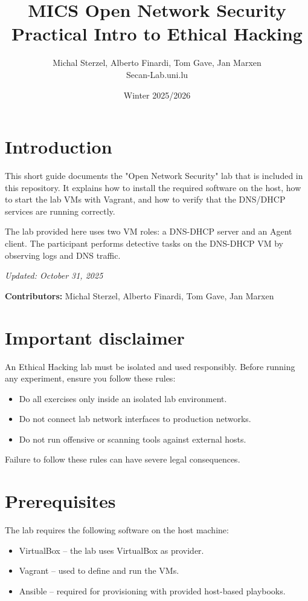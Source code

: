 \documentclass[11pt,a4paper]{article}
\title{\textbf{MICS Open Network Security}\\[0.5em]
Practical Intro to Ethical Hacking}
\author{Michal Sterzel, Alberto Finardi, Tom Gave, Jan Marxen \\ \small Secan-Lab.uni.lu}
\date{Winter 2025/2026}
\begin{document}
\maketitle
\tableofcontents
\newpage

\section{Introduction}
This short guide documents the "Open Network Security" lab that is
included in this repository. It explains how to install the required
software on the host, how to start the lab VMs with Vagrant, 
and how to verify that the DNS/DHCP services are running correctly.

The lab provided here uses two VM roles: a DNS-DHCP server and an Agent
client. The participant performs detective tasks on the DNS-DHCP VM by
observing logs and DNS traffic.

\textit{Updated: October 31, 2025}

\textbf{Contributors:} Michal Sterzel, Alberto Finardi, Tom Gave,
Jan Marxen

\section{Important disclaimer}
An Ethical Hacking lab must be isolated and used responsibly. Before
running any experiment, ensure you follow these rules:

\begin{itemize}[noitemsep]
  \item Do all exercises only inside an isolated lab environment.
  \item Do not connect lab network interfaces to production networks.
  \item Do not run offensive or scanning tools against external hosts.
\end{itemize}

Failure to follow these rules can have severe legal
consequences.

\section{Prerequisites}
The lab requires the following software on the host machine:

\begin{itemize}[noitemsep]
  \item VirtualBox -- the lab uses VirtualBox as provider.
  \item Vagrant -- used to define and run the VMs.
  \item Ansible -- required for provisioning with provided host-based playbooks.
\end{itemize}
\end{document}
